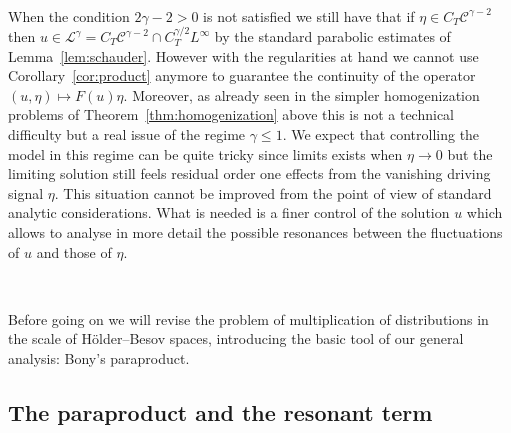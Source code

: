 \documentclass[a4paper,11pt]{article}
\newcommand{\LL}{\mathscr{L}}
\newcommand{\CC}{\mathscr{C}}
\begin{document}
\

When the condition $2 \gamma - 2 > 0$ is not satisfied we still have that if
$\eta \in C_T \CC^{\gamma - 2}$ then $u \in \LL^{\gamma} = C_T \CC^{\gamma -
2} \cap C_T^{\gamma / 2} L^{\infty}$ by the standard parabolic estimates of
Lemma~\ref{lem:schauder}. However with the regularities at hand we cannot use
Corollary~\ref{cor:product} anymore to guarantee the continuity of the
operator $(u, \eta) \mapsto F (u) \eta$. Moreover, as already seen in the
simpler homogenization problems of Theorem~\ref{thm:homogenization} above this is not a technical difficulty but a
real issue of the regime $\gamma \leqslant 1$. We expect that controlling the
model in this regime can be quite tricky since limits exists when $\eta
\rightarrow 0$ but the limiting solution still feels residual order one
effects from the vanishing driving signal $\eta$. This situation cannot be
improved from the point of view of standard analytic considerations. What is
needed is a finer control of the solution $u$ which allows to analyse in more
detail the possible resonances between the fluctuations of $u$ and those of
$\eta$.

\

Before going on we will revise the problem of multiplication of distributions
in the scale of H{\"o}lder--Besov spaces, introducing the basic tool of our
general analysis: Bony's paraproduct.

\subsection{The paraproduct and the resonant term}\label{ssec:bony}
\end{document}
